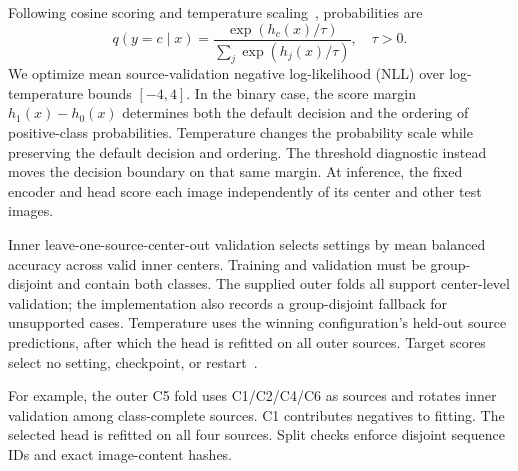 Following cosine scoring and temperature scaling~\cite{chen2019closer,guo2017calibration}, probabilities are
\begin{equation}
    q(y=c\mid x)=\frac{\exp(h_c(x)/\tau)}{\sum_j\exp(h_j(x)/\tau)},\quad\tau>0.
    \label{eq:prototype_classifier}
\end{equation}
We optimize mean source-validation negative log-likelihood (NLL) over log-temperature bounds $[-4,4]$. In the binary case, the score margin $h_1(x)-h_0(x)$ determines both the default decision and the ordering of positive-class probabilities. Temperature changes the probability scale while preserving the default decision and ordering. The threshold diagnostic instead moves the decision boundary on that same margin. At inference, the fixed encoder and head score each image independently of its center and other test images.

Inner leave-one-source-center-out validation selects settings by mean balanced accuracy across valid inner centers. Training and validation must be group-disjoint and contain both classes. The supplied outer folds all support center-level validation; the implementation also records a group-disjoint fallback for unsupported cases. Temperature uses the winning configuration's held-out source predictions, after which the head is refitted on all outer sources. Target scores select no setting, checkpoint, or restart~\cite{gulrajani2021domainbed,varma2006bias}.

For example, the outer C5 fold uses C1/C2/C4/C6 as sources and rotates inner validation among class-complete sources. C1 contributes negatives to fitting. The selected head is refitted on all four sources. Split checks enforce disjoint sequence IDs and exact image-content hashes.




